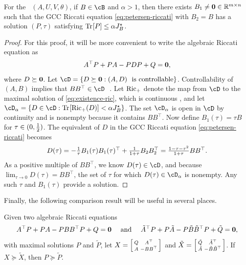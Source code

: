 \begin{lemma}
\label{lem:petersen-existence}
	For the \DDFproblem\ $(A, U, V, \theta)$, if $B \in \cB$ and $\alpha > 1$,
	then there exists $B_1 \neq \mathbf{0} \in \mathbb{R}^{m \times n}$
	such that the GCC Riccati equation \eqref{eq:petersen-riccati}
	with $B_2 = B$
	has a solution $(P, \tau)$
	satisfying
	$\mathrm{Tr} \hspace{-1pt} \left[ P \right] \leq \alpha J^\star_{B}$.
\end{lemma}
\begin{proof}
	For this proof, it will be more convenient to write the algebraic Riccati equation as
	\begin{equation}
		\label{eq:existence-ric}
		A^\top P + P A - P D P + Q = \mathbf{0},
	\end{equation}
	where $D \succeq \mathbf{0}$.
	Let $\cD = \{ D \succeq \zero: (A, D)\ \text{ is controllable} \}$.
	Controllability of $(A, B)$
	implies that
	$BB^\top \in \cD\ $
	.
	Let $\mathrm{Ric}_+$ denote the map from $\cD$ to the
	maximal solution of \eqref{eq:existence-ric},
	which is continuous %
	,
	and let $\cD_\alpha = \{D \in \cD : \trace{\Ric_+(D)} < \alpha J^\star_B \}$.
	The set $\cD_\alpha$ is open in $\cD$ by continuity
	and is nonempty because it contains $BB^\top$.
	Now define $B_1(\tau) = \tau B$ for $\tau \in (0, \frac{1}{2})$.
	The equivalent of $D$ in the GCC Riccati equation \eqref{eq:petersen-riccati} becomes
	\[
		\textstyle D(\tau) = -\frac{1}{\tau} B_1(\tau) B_1(\tau)^\top + \frac{1}{1 + \tau} B_2 B_2^\top
		= \frac{1 - \tau - \tau^2}{1 + \tau} B B^\top.
	\]
	As a positive multiple of $B B^\top$, we know $D(\tau) \in \cD$,
	and because $\lim_{\tau \to 0} D(\tau) = B B^\top$,
	the set of $\tau$ for which $D(\tau) \in \cD_\alpha$ is nonempty.
	Any such $\tau$ and $B_1(\tau)$ provide a solution.
\end{proof}

\noindent Finally, the following comparison result
will be useful in several places.

\begin{lemma}
\label{lem:lancaster-ARE-domination}
\newcommand{\alt}[1]{\tilde #1}
	Given two algebraic Riccati equations
	\[
		A^\top P + PA - P B B^\top P + Q = \zero
		\quad \text{ and } \quad 
		\alt{A}^\top P + P\alt{A} - P \alt{B}\alt{B}^\top P + \alt{Q} = \zero,
	\]
	with maximal solutions $P$ and $\alt{P}$,
	let
		$X = \begin{bsmallmatrix} Q & A^\top \\ A & -BB^\top \end{bsmallmatrix}$
		and
		$\alt{X} = \bsmallmat{\alt{Q} & \alt{A}^\top \\ \alt{A} & -\alt{B}\alt{B}^\top}$.
	If $X \!\succeq \!\alt{X}$, then $P \!\succeq \!\alt{P}$.
\end{lemma}

